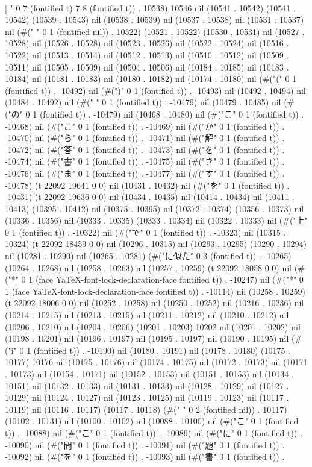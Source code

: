 \\]
" 0 7 (fontified t) 7 8 (fontified t)) . 10538) 10546 nil (10541 . 10542) (10541 . 10542) (10539 . 10543) nil (10538 . 10539) nil (10537 . 10538) nil (10531 . 10537) nil (#(" " 0 1 (fontified nil)) . 10522) (10521 . 10522) (10530 . 10531) nil (10527 . 10528) nil (10526 . 10528) nil (10523 . 10526) nil (10522 . 10524) nil (10516 . 10522) nil (10513 . 10514) nil (10512 . 10513) nil (10510 . 10512) nil (10509 . 10511) nil (10505 . 10509) nil (10504 . 10506) nil (10184 . 10185) nil (10183 . 10184) nil (10181 . 10183) nil (10180 . 10182) nil (10174 . 10180) nil (#("(" 0 1 (fontified t)) . -10492) nil (#(")" 0 1 (fontified t)) . -10493) nil (10492 . 10494) nil (10484 . 10492) nil (#(" " 0 1 (fontified t)) . -10479) nil (10479 . 10485) nil (#("の" 0 1 (fontified t)) . -10479) nil (10468 . 10480) nil (#("こ" 0 1 (fontified t)) . -10468) nil (#("こ" 0 1 (fontified t)) . -10469) nil (#("か" 0 1 (fontified t)) . -10470) nil (#("ら" 0 1 (fontified t)) . -10471) nil (#("解" 0 1 (fontified t)) . -10472) nil (#("答" 0 1 (fontified t)) . -10473) nil (#("を" 0 1 (fontified t)) . -10474) nil (#("書" 0 1 (fontified t)) . -10475) nil (#("き" 0 1 (fontified t)) . -10476) nil (#("ま" 0 1 (fontified t)) . -10477) nil (#("す" 0 1 (fontified t)) . -10478) (t 22092 19641 0 0) nil (10431 . 10432) nil (#("を" 0 1 (fontified t)) . -10431) (t 22092 19636 0 0) nil (10434 . 10435) nil (10414 . 10434) nil (10411 . 10413) (10395 . 10412) nil (10375 . 10395) nil (10372 . 10374) (10356 . 10373) nil (10336 . 10356) nil (10333 . 10335) (10333 . 10334) nil (10322 . 10333) nil (#("上" 0 1 (fontified t)) . -10322) nil (#("で" 0 1 (fontified t)) . -10323) nil (10315 . 10324) (t 22092 18459 0 0) nil (10296 . 10315) nil (10293 . 10295) (10290 . 10294) nil (10281 . 10290) nil (10265 . 10281) (#("に似た" 0 3 (fontified t)) . -10265) (10264 . 10268) nil (10258 . 10263) nil (10257 . 10259) (t 22092 18058 0 0) nil (#("*" 0 1 (face YaTeX-font-lock-declaration-face fontified t)) . -10247) nil (#("*" 0 1 (face YaTeX-font-lock-declaration-face fontified t)) . -10114) nil (10258 . 10259) (t 22092 18006 0 0) nil (10252 . 10258) nil (10250 . 10252) nil (10216 . 10236) nil (10214 . 10215) nil (10213 . 10215) nil (10211 . 10212) nil (10210 . 10212) nil (10206 . 10210) nil (10204 . 10206) (10201 . 10203) 10202 nil (10201 . 10202) nil (10198 . 10201) nil (10196 . 10197) nil (10195 . 10197) nil (10190 . 10195) nil (#("i" 0 1 (fontified t)) . -10190) nil (10180 . 10191) nil (10178 . 10180) (10175 . 10177) 10176 nil (10175 . 10176) nil (10174 . 10175) nil (10172 . 10173) nil (10171 . 10173) nil (10154 . 10171) nil (10152 . 10153) nil (10151 . 10153) nil (10134 . 10151) nil (10132 . 10133) nil (10131 . 10133) nil (10128 . 10129) nil (10127 . 10129) nil (10124 . 10127) nil (10123 . 10125) nil (10119 . 10123) nil (10117 . 10119) nil (10116 . 10117) (10117 . 10118) (#("  " 0 2 (fontified nil)) . 10117) (10102 . 10131) nil (10100 . 10102) nil (10088 . 10100) nil (#("こ" 0 1 (fontified t)) . -10088) nil (#("こ" 0 1 (fontified t)) . -10089) nil (#("に" 0 1 (fontified t)) . -10090) nil (#("問" 0 1 (fontified t)) . -10091) nil (#("題" 0 1 (fontified t)) . -10092) nil (#("を" 0 1 (fontified t)) . -10093) nil (#("書" 0 1 (fontified t)) . 